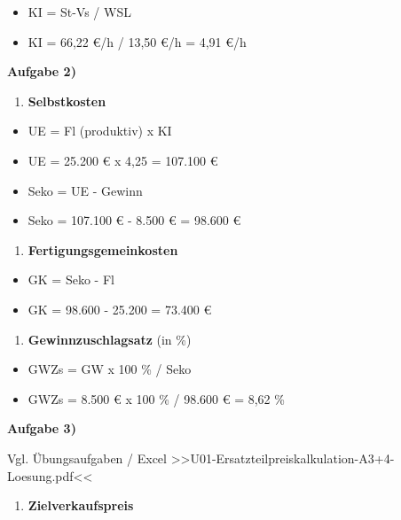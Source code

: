 \begin{itemize}
\item
  KI = St-Vs / WSL
\item
  KI = 66,22 €/h / 13,50 €/h = 4,91 €/h
\end{itemize}

\textbf{Aufgabe 2)}

\begin{enumerate}
\def\labelenumi{\alph{enumi})}
\item
  \textbf{Selbstkosten}
\end{enumerate}

\begin{itemize}
\item
  UE = Fl (produktiv) x KI
\item
  UE = 25.200 € x 4,25 = 107.100 €
\item
  Seko = UE - Gewinn
\item
  Seko = 107.100 € - 8.500 € = 98.600 €
\end{itemize}

\begin{enumerate}
\def\labelenumi{\alph{enumi})}
\setcounter{enumi}{1}
\item
  \textbf{Fertigungsgemeinkosten}
\end{enumerate}

\begin{itemize}
\item
  GK = Seko - Fl
\item
  GK = 98.600 - 25.200 = 73.400 €
\end{itemize}

\begin{enumerate}
\def\labelenumi{\alph{enumi})}
\setcounter{enumi}{2}
\item
  \textbf{Gewinnzuschlagsatz} (in \%)
\end{enumerate}

\begin{itemize}
\item
  GWZs = GW x 100 \% / Seko
\item
  GWZs = 8.500 € x 100 \% / 98.600 € = 8,62 \%
\end{itemize}

\textbf{Aufgabe 3)}

Vgl. Übungsaufgaben / Excel
>>U01-Ersatzteilpreiskalkulation-A3+4-Loesung.pdf<<

\begin{enumerate}
\def\labelenumi{\alph{enumi})}
\item
  \textbf{Zielverkaufspreis}
\end{enumerate}

